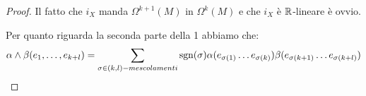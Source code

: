 \begin{proof}
	Il fatto che $i_X$ manda $\Omega^{k+1}(M)$ in $\Omega^k(M)$ e che $i_X$ è $\R$-lineare è ovvio.
	
	
	
	
	Per quanto riguarda la seconda parte della 1 abbiamo che:
	\begin{equation*}
		\alpha\wedge\beta (\seqb e{k+l},) = \sum_{\sigma \in (k,l)-mescolamenti} \sgn(\sigma) \alpha(e_{\sigma(1)}\ldots e_{\sigma(k)}) \beta(e_{\sigma(k+1)}\ldots e_{\sigma(k+l)})
	\end{equation*}
	

\end{proof}
